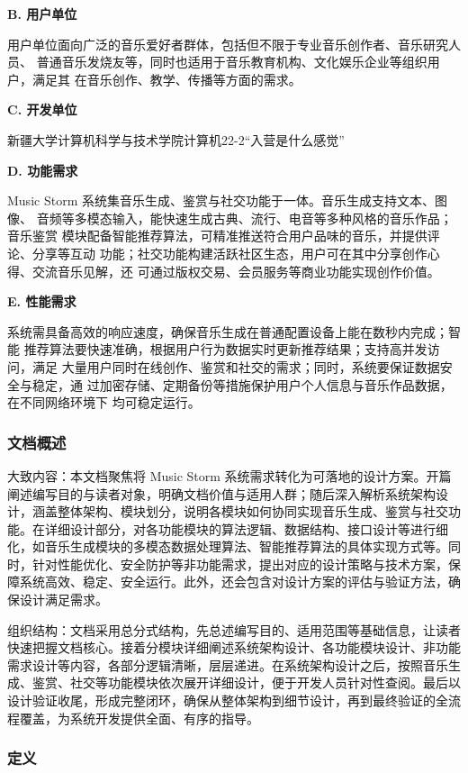 \documentclass{base}
\numberwithin{figure}{section} %
\begin{document}
\textbf{B. 用户单位​}

用户单位面向广泛的音乐爱好者群体，包括但不限于专业音乐创作者、音乐研究人员、	普通音乐发烧友等，同时也适用于音乐教育机构、文化娱乐企业等组织用户，满足其	在音乐创作、教学、传播等方面的需求。​

\textbf{C. 开发单位​}

新疆大学计算机科学与技术学院计算机22-2“入营是什么感觉”

\textbf{D. 功能需求​}

Music Storm 系统集音乐生成、鉴赏与社交功能于一体。音乐生成支持文本、图像、	音频等多模态输入，能快速生成古典、流行、电音等多种风格的音乐作品；音乐鉴赏	模块配备智能推荐算法，可精准推送符合用户品味的音乐，并提供评论、分享等互动	功能；社交功能构建活跃社区生态，用户可在其中分享创作心得、交流音乐见解，还	可通过版权交易、会员服务等商业功能实现创作价值。

\textbf{E. 性能需求​}

系统需具备高效的响应速度，确保音乐生成在普通配置设备上能在数秒内完成；智能	推荐算法要快速准确，根据用户行为数据实时更新推荐结果；支持高并发访问，满足	大量用户同时在线创作、鉴赏和社交的需求；同时，系统要保证数据安全与稳定，通	过加密存储、定期备份等措施保护用户个人信息与音乐作品数据，在不同网络环境下	均可稳定运行。

\subsubsection{文档概述}

大致内容：本文档聚焦将 Music Storm 系统需求转化为可落地的设计方案。开篇阐述编写目的与读者对象，明确文档价值与适用人群；随后深入解析系统架构设计，涵盖整体架构、模块划分，说明各模块如何协同实现音乐生成、鉴赏与社交功能。在详细设计部分，对各功能模块的算法逻辑、数据结构、接口设计等进行细化，如音乐生成模块的多模态数据处理算法、智能推荐算法的具体实现方式等。同时，针对性能优化、安全防护等非功能需求，提出对应的设计策略与技术方案，保障系统高效、稳定、安全运行。此外，还会包含对设计方案的评估与验证方法，确保设计满足需求。​

组织结构：文档采用总分式结构，先总述编写目的、适用范围等基础信息，让读者快速把握文档核心。接着分模块详细阐述系统架构设计、各功能模块设计、非功能需求设计等内容，各部分逻辑清晰，层层递进。在系统架构设计之后，按照音乐生成、鉴赏、社交等功能模块依次展开详细设计，便于开发人员针对性查阅。最后以设计验证收尾，形成完整闭环，确保从整体架构到细节设计，再到最终验证的全流程覆盖，为系统开发提供全面、有序的指导。

\subsubsection{定义}
\end{document}
